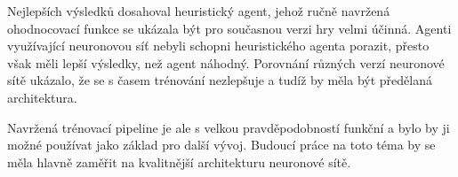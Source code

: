 Nejlepších výsledků dosahoval heuristický agent, jehož ručně navržená ohodnocovací funkce se ukázala být pro současnou verzi hry velmi účinná.
Agenti využívající neuronovou síť nebyli schopni heuristického agenta porazit, přesto však měli lepší výsledky, než agent náhodný. Porovnání
různých verzí neuronové sítě ukázalo, že se s časem trénování nezlepšuje a tudíž by měla být předělaná architektura.

Navržená trénovací pipeline je ale s velkou pravděpodobností funkční a bylo by ji možné používat jako základ pro další vývoj. Budoucí práce na toto téma
by se měla hlavně zaměřit na kvalitnější architekturu neuronové sítě.